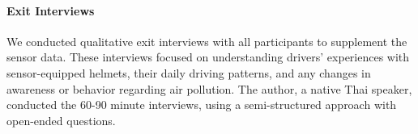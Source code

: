 \paragraph{Exit Interviews}
We conducted qualitative exit interviews with all participants to supplement the sensor data. 
These interviews focused on understanding drivers' experiences with sensor-equipped helmets, their daily driving patterns, and any changes in awareness or behavior regarding air pollution. 
The author, a native Thai speaker, conducted the 60-90 minute interviews, using a semi-structured approach with open-ended questions. 
